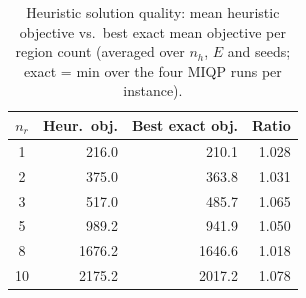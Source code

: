 \begin{table}[t]
\centering
\caption{Heuristic solution quality: mean heuristic objective vs.\ best exact mean objective per region count (averaged over $n_h$, $E$ and seeds; exact = min over the four MIQP runs per instance).}
\label{tab:heuristic-quality}
\begin{tabular}{crrr}
\toprule
$n_r$ & Heur.\ obj. & Best exact obj. & Ratio \\
\midrule
1 & 216.0 & 210.1 & 1.028 \\
2 & 375.0 & 363.8 & 1.031 \\
3 & 517.0 & 485.7 & 1.065 \\
5 & 989.2 & 941.9 & 1.050 \\
8 & 1676.2 & 1646.6 & 1.018 \\
10 & 2175.2 & 2017.2 & 1.078 \\
\bottomrule
\end{tabular}
\end{table}
